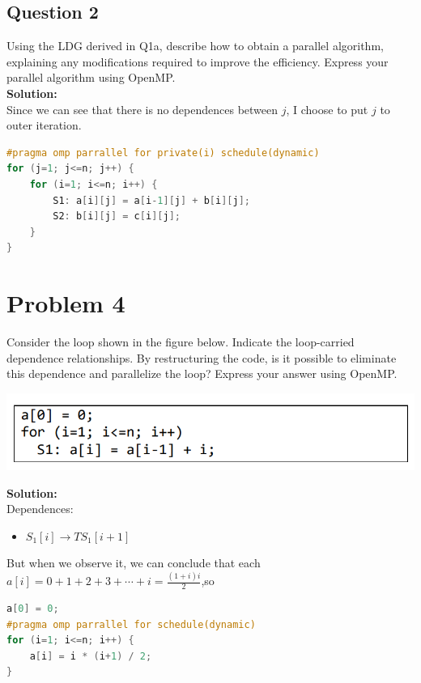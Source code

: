 \documentclass{article}
\begin{document}
\subsection{Question 2}
Using the LDG derived in Q1a, describe how to obtain a parallel algorithm, 
explaining any modifications required to improve the efficiency. Express your 
parallel algorithm using OpenMP. 
\\\textbf{Solution:}\\
Since we can see that there is no dependences between $j$, I choose to put $j$ to outer iteration.
\begin{lstlisting}[language=c++]
#pragma omp parrallel for private(i) schedule(dynamic)
for (j=1; j<=n; j++) {
    for (i=1; i<=n; i++) {
        S1: a[i][j] = a[i-1][j] + b[i][j];
        S2: b[i][j] = c[i][j];
    }
}
\end{lstlisting}


\section{Problem 4}
Consider the loop shown in the figure below. Indicate the loop-carried 
dependence relationships. By restructuring the code, is it possible to eliminate 
this dependence and parallelize the loop? Express your answer using OpenMP.
\begin{center}
    \includegraphics[scale = 0.4]{4.png}\\
\end{center}
\textbf{Solution:}\\
Dependences:
\begin{itemize}
    \item $S_{1}[i]\rightarrow TS_{1}[i+1]$
\end{itemize}
But when we observe it, we can conclude that each $a[i]=0+1+2+3+\cdots+i=\frac{(1+i)i}{2}$,so
\begin{lstlisting}[language=c++]
a[0] = 0;
#pragma omp parrallel for schedule(dynamic)
for (i=1; i<=n; i++) {
    a[i] = i * (i+1) / 2;
}
\end{lstlisting}
\end{document}
